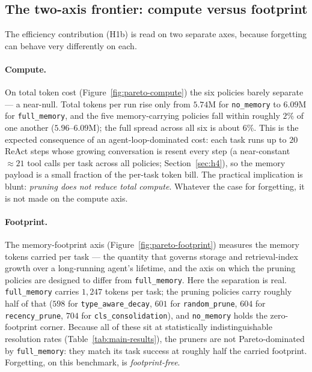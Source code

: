 \subsection{The two-axis frontier: compute versus footprint}

The efficiency contribution (H1b) is read on two separate axes, because forgetting can
behave very differently on each.

\paragraph{Compute.}
On total token cost (Figure~\ref{fig:pareto-compute}) the six policies barely separate ---
a near-null. Total tokens per run rise only from $5.74$M for \texttt{no\_memory} to $6.09$M
for \texttt{full\_memory}, and the five memory-carrying policies fall within roughly $2\%$
of one another ($5.96$--$6.09$M); the full spread across all six is about $6\%$. This is the
expected consequence of an agent-loop-dominated cost: each task runs up to $20$ ReAct steps
whose growing conversation is resent every step (a near-constant $\approx 21$ tool calls per
task across all policies; Section~\ref{sec:h4}), so the memory payload is a small fraction of
the per-task token bill. The practical implication is blunt: \emph{pruning does not reduce
total compute}. Whatever the case for forgetting, it is not made on the compute axis.

\paragraph{Footprint.}
The memory-footprint axis (Figure~\ref{fig:pareto-footprint}) measures the memory tokens
carried per task --- the quantity that governs storage and retrieval-index growth over a
long-running agent's lifetime, and the axis on which the pruning policies are designed to
differ from \texttt{full\_memory}. Here the separation is real. \texttt{full\_memory}
carries $1{,}247$ tokens per task; the pruning policies carry roughly half of that
($598$ for \texttt{type\_aware\_decay}, $601$ for \texttt{random\_prune}, $604$ for
\texttt{recency\_prune}, $704$ for \texttt{cls\_consolidation}), and \texttt{no\_memory}
holds the zero-footprint corner. Because all of these sit at statistically
indistinguishable resolution rates (Table~\ref{tab:main-results}), the pruners are not
Pareto-dominated by \texttt{full\_memory}: they match its task success at roughly half the
carried footprint. Forgetting, on this benchmark, is \emph{footprint-free}.

